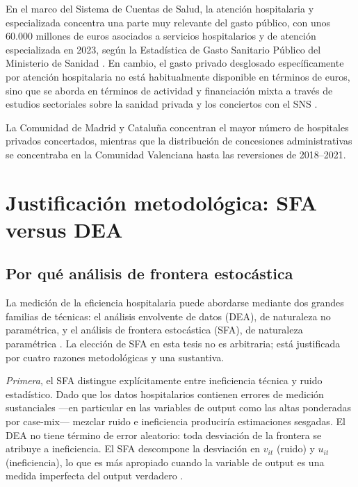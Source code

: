 En el marco del Sistema de Cuentas de Salud, la atención hospitalaria 
y especializada concentra una parte muy relevante del gasto público, 
con unos 60.000 millones de euros asociados a servicios hospitalarios 
y de atención especializada en 2023, según la Estadística de Gasto 
Sanitario Público del Ministerio de Sanidad \citep{ministeriosanidad2023}. 
En cambio, el gasto privado desglosado específicamente por atención 
hospitalaria no está habitualmente disponible en términos de euros, 
sino que se aborda en términos de actividad y financiación mixta 
a través de estudios sectoriales sobre la sanidad privada y los conciertos 
con el SNS \citep{fbbva2025,consalud2025}. 

La Comunidad de Madrid y 
Cataluña concentran el mayor número de hospitales privados 
concertados, mientras que la distribución de concesiones 
administrativas se concentraba en la Comunidad Valenciana hasta 
las reversiones de 2018--2021.
\section{Justificación metodológica: SFA versus DEA}
\label{sec:justificacion_metodologica}

\subsection{Por qué análisis de frontera estocástica}

La medición de la eficiencia hospitalaria puede abordarse mediante dos grandes familias de técnicas: el análisis envolvente de datos (DEA), de naturaleza no paramétrica, y el análisis de frontera estocástica (SFA), de naturaleza paramétrica \citep{coelli2005}. La elección de SFA en esta tesis no es arbitraria; está justificada por cuatro razones metodológicas y una sustantiva.

\textit{Primera}, el SFA distingue explícitamente entre ineficiencia técnica y ruido estadístico. Dado que los datos hospitalarios contienen errores de medición sustanciales ---en particular en las variables de output como las altas ponderadas por case-mix--- mezclar ruido e ineficiencia produciría estimaciones sesgadas. El DEA no tiene término de error aleatorio: toda desviación de la frontera se atribuye a ineficiencia. El SFA descompone la desviación en $v_{it}$ (ruido) y $u_{it}$ (ineficiencia), lo que es más apropiado cuando la variable de output es una medida imperfecta del output verdadero \citep{aigner1977,meeusen1977,kumbhakar2000}.

